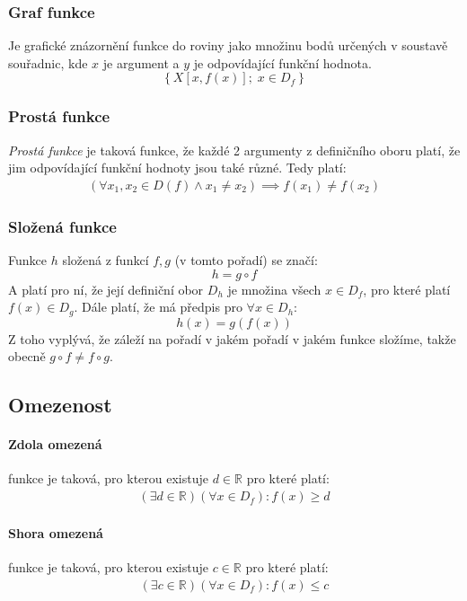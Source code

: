 \documentclass[12pt]{article}
\newcommand{\nR}{\mathbb{R}} %
\begin{document}
\subsubsection{Graf funkce}
Je grafické znázornění funkce do roviny jako množinu bodů určených v soustavě souřadnic, kde $x$ je argument a $y$ je odpovídající funkční hodnota.
\begin{equation}
\left\{ X\left[x, f(x)\right]; \; x \in D_f \right\}
\end{equation}
\subsubsection{Prostá funkce}
\emph{Prostá funkce} je taková funkce, že každé 2 argumenty z definičního oboru platí, že jim odpovídající funkční hodnoty jsou také různé. Tedy platí:
\begin{align}
(\forall x_1,x_2 \in D(f) \land x_1 \neq  x_2) \implies f(x_1) \neq f(x_2)
\end{align}
\subsubsection{Složená funkce}
Funkce $h$ složená z funkcí $f,g$ (v tomto pořadí) se značí:
\begin{equation}
h = g \circ f
\end{equation}
A platí pro ní, že její definiční obor $D_h$ je množina všech $x \in D_f$, pro které platí $f(x) \in D_g$. Dále platí, že má předpis pro $\forall x \in D_h$:
\begin{equation}
h(x) = g(f(x))
\end{equation}
Z toho vyplývá, že záleží na pořadí v jakém pořadí v jakém funkce složíme, takže obecně $ g \circ f \neq f \circ g$.
\subsection{Omezenost}
\paragraph{Zdola omezená} funkce je taková, pro kterou existuje $d \in \nR$ pro které platí:
\begin{align}
( \exists d \in \nR)( \forall x \in D_f): f(x) \geq d
\end{align}
\paragraph{Shora omezená} funkce je taková, pro kterou existuje $c \in \nR$ pro které platí:
\begin{align}
( \exists c \in \nR)( \forall x \in D_f): f(x) \leq c
\end{align}
\end{document}
